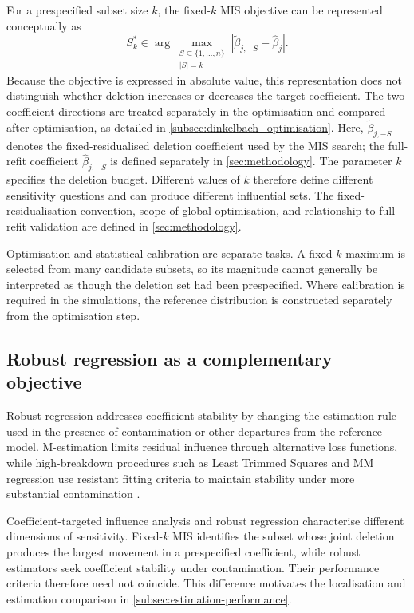 \documentclass[../main.tex]{subfiles}
\begin{document}
For a prespecified subset size \(k\), the fixed-\(k\) MIS objective can be represented conceptually as
\[
S_k^*
\in
\arg\max_{\substack{S\subseteq\{1,\ldots,n\}\\ |S|=k}}
\left|
\widetilde{\beta}_{j,-S}
-
\widehat{\beta}_{j}
\right|.
\]
Because the objective is expressed in absolute value, this representation does not distinguish whether deletion increases or decreases the target coefficient. The two coefficient directions are treated separately in the optimisation and compared after optimisation, as detailed in \autoref{subsec:dinkelbach_optimisation}. Here, \(\widetilde{\beta}_{j,-S}\) denotes the fixed-residualised deletion coefficient used by the MIS search; the full-refit coefficient \(\widehat{\beta}_{j,-S}\) is defined separately in \autoref{sec:methodology}. The parameter \(k\) specifies the deletion budget. Different values of \(k\) therefore define different sensitivity questions and can produce different influential sets. The fixed-residualisation convention, scope of global optimisation, and relationship to full-refit validation are defined in \autoref{sec:methodology}.

Optimisation and statistical calibration are separate tasks. A fixed-\(k\) maximum is selected from many candidate subsets, so its magnitude cannot generally be interpreted as though the deletion set had been prespecified. Where calibration is required in the simulations, the reference distribution is constructed separately from the optimisation step.

\subsection{Robust regression as a complementary objective}
\label{subsec:robust_regression}

Robust regression addresses coefficient stability by changing the estimation rule used in the presence of contamination or other departures from the reference model. M-estimation limits residual influence through alternative loss functions, while high-breakdown procedures such as Least Trimmed Squares and MM regression use resistant fitting criteria to maintain stability under more substantial contamination \parencite{huber1964location,huber1973robust,rousseeuw1984applying,yohai1987high}.

Coefficient-targeted influence analysis and robust regression characterise different dimensions of sensitivity. Fixed-\(k\) MIS identifies the subset whose joint deletion produces the largest movement in a prespecified coefficient, while robust estimators seek coefficient stability under contamination. Their performance criteria therefore need not coincide. This difference motivates the localisation and estimation comparison in \autoref{subsec:estimation-performance}.
\end{document}
